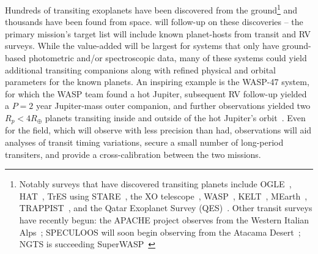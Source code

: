 Hundreds of transiting exoplanets have been discovered from the ground\footnote{Notably surveys %
	that have discovered transiting planets %
	include OGLE~\citep{udalski_ogle0_2003,udalski_ogle1_2003}, HAT~\citep{bakos_HAT_2004}, TrES using STARE~\citep{alonso_tres1_2004}, the XO telescope~\citep{mccullough_xo_2005}, WASP~\citep{pollacco_wasp_2006}, KELT~\citep{pepper_KELT_2007}, MEarth~\citep{irwin_mearth_2008}, TRAPPIST~\citep{jehin_trappist_2011}, and the Qatar Exoplanet Survey (QES)~\citep{alsubai_qatar_2014}. Other transit surveys have recently begun: the APACHE project observes from the Western Italian Alps~\citep{sozzetti_apache_2013}; SPECULOOS will soon begin observing from the Atacama Desert~\citep{gillon_speculoos_2013}; NGTS is succeeding SuperWASP~\citep{wheatley_ngts_2013} }
and thousands have been found from space.
\tess will follow-up on these discoveries -- the primary mission's target list will include known planet-hosts from transit and RV surveys.
While the value-added will be largest for systems that only have ground-based photometric and/or spectroscopic data, %
many of these systems could yield additional transiting companions along with refined physical and orbital parameters for the known planets.
An inspiring example is the WASP-47 system, for which the WASP team found a hot Jupiter, subsequent RV follow-up yielded a $P=2$ year Jupiter-mass outer companion, and further \ktwo observations yielded two $R_p<4R_\oplus$ planets transiting inside and outside of the hot Jupiter's orbit~\citep{hellier_wasp47_2012,neveu-vanmalle_HJrelatives_2016,becker_wasp47_2015,dai_doppler_2015}.
Even for the \kepler field, which \tess will observe with less precision than \kepler had, \tesss observations will aid analyses of transit timing variations, secure a small number of long-period transiters, and provide a cross-calibration between the two missions.	

